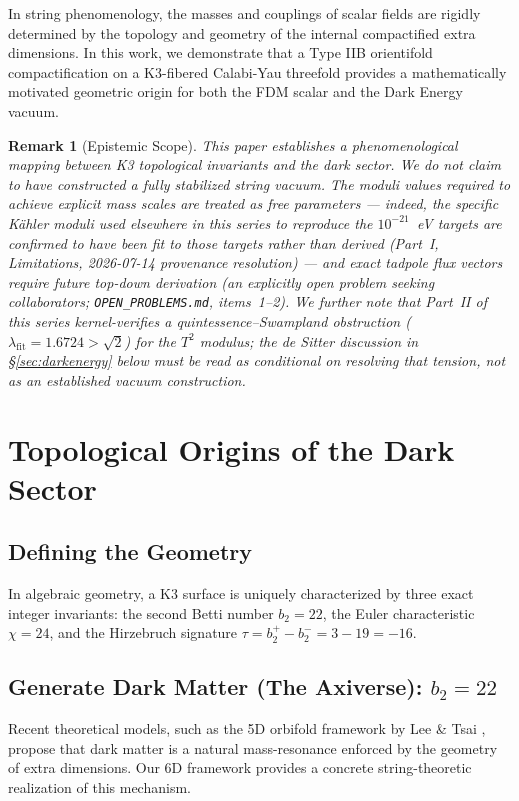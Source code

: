 \documentclass[aps,prd,twocolumn,nofootinbib,superscriptaddress,10pt]{revtex4-2}
\newtheorem{remark}{Remark}
\begin{document}
In string phenomenology, the masses and couplings of scalar fields are rigidly determined by the topology and geometry of the internal compactified extra dimensions. In this work, we demonstrate that a Type IIB orientifold compactification on a K3-fibered Calabi-Yau threefold provides a mathematically motivated geometric origin for both the FDM scalar and the Dark Energy vacuum.

\begin{remark}[Epistemic Scope]
This paper establishes a phenomenological mapping between K3 topological invariants and the dark sector. We do not claim to have constructed a fully stabilized string vacuum. The moduli values required to achieve explicit mass scales are treated as free parameters --- indeed, the specific K\"ahler moduli used elsewhere in this series to reproduce the $10^{-21}$~eV targets are confirmed to have been fit \emph{to} those targets rather than derived (Part~I, Limitations, 2026-07-14 provenance resolution) --- and exact tadpole flux vectors require future top-down derivation (an explicitly open problem seeking collaborators; \texttt{OPEN\_PROBLEMS.md}, items~1--2). We further note that Part~II of this series kernel-verifies a quintessence--Swampland \emph{obstruction} ($\lambda_{\mathrm{fit}} = 1.6724 > \sqrt{2}$) for the $T^2$ modulus; the de Sitter discussion in \S\ref{sec:darkenergy} below must be read as conditional on resolving that tension, not as an established vacuum construction.
\end{remark}

\section{Topological Origins of the Dark Sector}

\subsection{Defining the Geometry}
In algebraic geometry, a K3 surface is uniquely characterized by three exact integer invariants: the second Betti number $b_2 = 22$, the Euler characteristic $\chi = 24$, and the Hirzebruch signature $\tau = b_2^+ - b_2^- = 3 - 19 = -16$. 

\subsection{Generate Dark Matter (The Axiverse): $b_2 = 22$}
Recent theoretical models, such as the 5D orbifold framework by Lee \& Tsai \cite{tsai2026}, propose that dark matter is a natural mass-resonance enforced by the geometry of extra dimensions. Our 6D framework provides a concrete string-theoretic realization of this mechanism.
\end{document}
